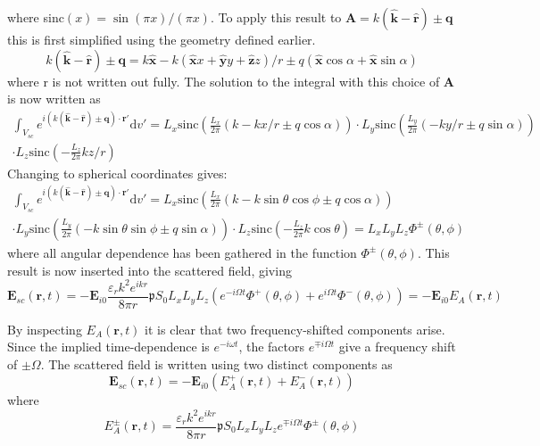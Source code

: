 \documentclass[10pt,a4paper]{eitExjobb}
\begin{document}
	where sinc$(x) = \sin(\pi x)/(\pi x)$. To apply this result to $\bm{A} = k(\bm{\hat{k}} - \bm{\hat{r}}) \pm \bm{q}$ this is first simplified using the geometry defined earlier.
	\begin{equation*}
	k(\bm{\hat{k}} - \bm{\hat{r}}) \pm \bm{q} = k\bm{\hat{x}} - k(\bm{\hat{x}} x + \bm{\hat{y}} y + \bm{\hat{z}} z)/r \pm q(\bm{\hat{x}} \cos{\alpha} + \bm{\hat{x}} \sin{\alpha})
	\end{equation*}
	where r is not written out fully. The solution to the integral with this choice of $\bm{A}$ is now written as
	\begin{multline*}
	\int_{V_{sc}} e^{i(	k(\bm{\hat{k}} - \bm{\hat{r}}) \pm \bm{q}) \cdot \bm{r}'} \mathrm{d}v' =
	L_x \text{sinc} \left( \frac{L_x}{2\pi} ( k - kx/r \pm q\cos{\alpha} ) \right) \cdot
	L_y \text{sinc} \left( \frac{L_y}{2\pi} ( - ky/r \pm q\sin{\alpha} ) \right) \\
	\cdot L_z \text{sinc} \left( -\frac{L_z}{2\pi} kz/r \right)
	\end{multline*}
	Changing to spherical coordinates gives:
	\begin{multline*}
	\int_{V_{sc}} e^{i(	k(\bm{\hat{k}} - \bm{\hat{r}}) \pm \bm{q}) \cdot \bm{r}'} \mathrm{d}v' =
	L_x \text{sinc} \left( \frac{L_x}{2\pi} ( k - k\sin{\theta}\cos{\phi} \pm q\cos{\alpha} ) \right) \\
	\cdot L_y \text{sinc} \left( \frac{L_y}{2\pi} ( - k\sin{\theta}\sin{\phi} \pm q\sin{\alpha} ) \right)
	\cdot L_z \text{sinc} \left( -\frac{L_z}{2\pi} k\cos{\theta} \right) = L_x L_y L_z \Phi^\pm (\theta,\phi)
	\end{multline*}
	where all angular dependence has been gathered in the function $\Phi^\pm (\theta,\phi)$. This result is now inserted into the scattered field, giving
	\begin{equation*}
	\bm{E}_{sc}(\bm{r},t) = -\bm{E}_{i0} \frac{\varepsilon_rk^2 e^{ikr}}{8\pi r} \mathfrak{p} S_0 L_x L_y L_z \left( e^{-i\Omega t} \Phi^+ (\theta,\phi)  + e^{i\Omega t} \Phi^- (\theta,\phi) \right) = -\bm{E}_{i0} E_A(\bm{r},t)
	\end{equation*}
	
	By inspecting $E_A(\bm{r},t)$ it is clear that two frequency-shifted components arise. Since the implied time-dependence is $e^{-i\omega t}$, the factors $e^{\mp i\Omega t}$ give a frequency shift of $\pm \Omega$. The scattered field is written using two distinct components as
	\begin{equation*}
	\bm{E}_{sc} (\bm{r},t) = -\bm{E}_{i0} \left( E_A^+ (\bm{r},t) + E_A^- (\bm{r},t) \right)
	\end{equation*}
	where
	\begin{equation*}
	E_A^\pm (\bm{r},t) = \frac{\varepsilon_rk^2 e^{ikr}}{8\pi r} \mathfrak{p} S_0 L_x L_y L_z e^{\mp i\Omega t} \Phi^\pm (\theta,\phi)
	\end{equation*}
	
\end{document}
